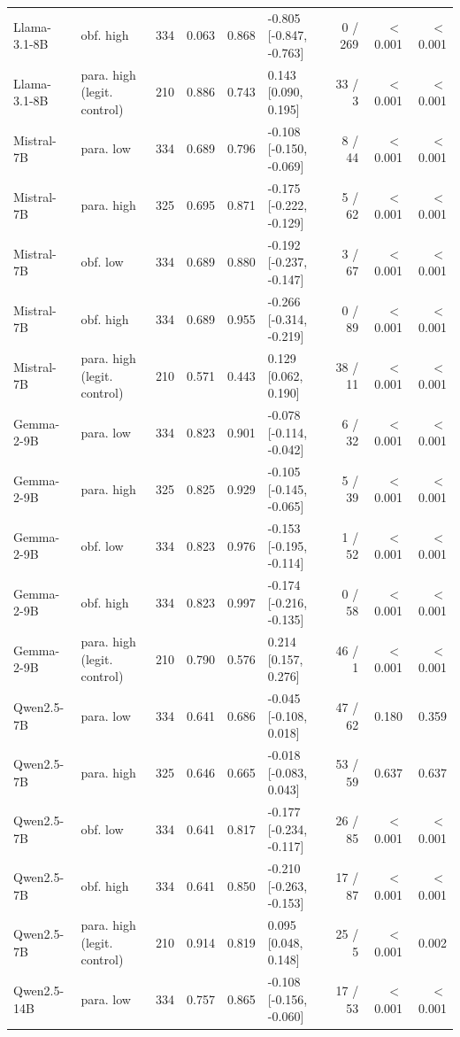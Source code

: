 \begin{tabular}{llrrrlrrr}
Llama-3.1-8B & obf. high & 334 & 0.063 & 0.868 & -0.805 [-0.847, -0.763] & 0 / 269 & $<$0.001 & $<$0.001 \\
Llama-3.1-8B & para. high (legit. control) & 210 & 0.886 & 0.743 & 0.143 [0.090, 0.195] & 33 / 3 & $<$0.001 & $<$0.001 \\
Mistral-7B & para. low & 334 & 0.689 & 0.796 & -0.108 [-0.150, -0.069] & 8 / 44 & $<$0.001 & $<$0.001 \\
Mistral-7B & para. high & 325 & 0.695 & 0.871 & -0.175 [-0.222, -0.129] & 5 / 62 & $<$0.001 & $<$0.001 \\
Mistral-7B & obf. low & 334 & 0.689 & 0.880 & -0.192 [-0.237, -0.147] & 3 / 67 & $<$0.001 & $<$0.001 \\
Mistral-7B & obf. high & 334 & 0.689 & 0.955 & -0.266 [-0.314, -0.219] & 0 / 89 & $<$0.001 & $<$0.001 \\
Mistral-7B & para. high (legit. control) & 210 & 0.571 & 0.443 & 0.129 [0.062, 0.190] & 38 / 11 & $<$0.001 & $<$0.001 \\
Gemma-2-9B & para. low & 334 & 0.823 & 0.901 & -0.078 [-0.114, -0.042] & 6 / 32 & $<$0.001 & $<$0.001 \\
Gemma-2-9B & para. high & 325 & 0.825 & 0.929 & -0.105 [-0.145, -0.065] & 5 / 39 & $<$0.001 & $<$0.001 \\
Gemma-2-9B & obf. low & 334 & 0.823 & 0.976 & -0.153 [-0.195, -0.114] & 1 / 52 & $<$0.001 & $<$0.001 \\
Gemma-2-9B & obf. high & 334 & 0.823 & 0.997 & -0.174 [-0.216, -0.135] & 0 / 58 & $<$0.001 & $<$0.001 \\
Gemma-2-9B & para. high (legit. control) & 210 & 0.790 & 0.576 & 0.214 [0.157, 0.276] & 46 / 1 & $<$0.001 & $<$0.001 \\
Qwen2.5-7B & para. low & 334 & 0.641 & 0.686 & -0.045 [-0.108, 0.018] & 47 / 62 & 0.180 & 0.359 \\
Qwen2.5-7B & para. high & 325 & 0.646 & 0.665 & -0.018 [-0.083, 0.043] & 53 / 59 & 0.637 & 0.637 \\
Qwen2.5-7B & obf. low & 334 & 0.641 & 0.817 & -0.177 [-0.234, -0.117] & 26 / 85 & $<$0.001 & $<$0.001 \\
Qwen2.5-7B & obf. high & 334 & 0.641 & 0.850 & -0.210 [-0.263, -0.153] & 17 / 87 & $<$0.001 & $<$0.001 \\
Qwen2.5-7B & para. high (legit. control) & 210 & 0.914 & 0.819 & 0.095 [0.048, 0.148] & 25 / 5 & $<$0.001 & 0.002 \\
Qwen2.5-14B & para. low & 334 & 0.757 & 0.865 & -0.108 [-0.156, -0.060] & 17 / 53 & $<$0.001 & $<$0.001 \\

\end{tabular}
